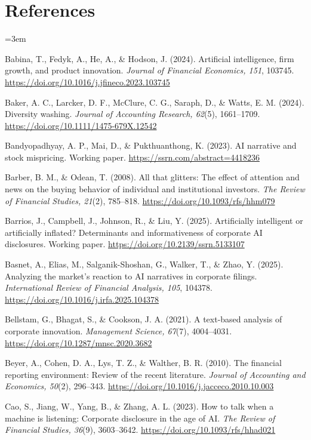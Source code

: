 \clearpage
\section*{References}

\begingroup
\small
\raggedright
\setlength{\parindent}{0pt}
\setlength{\parskip}{0.6em}
\emergencystretch=3em
\sloppy

Babina, T., Fedyk, A., He, A., \& Hodson, J. (2024). Artificial intelligence, firm growth, and product innovation. \textit{Journal of Financial Economics, 151}, 103745. \url{https://doi.org/10.1016/j.jfineco.2023.103745}

Baker, A. C., Larcker, D. F., McClure, C. G., Saraph, D., \& Watts, E. M. (2024). Diversity washing. \textit{Journal of Accounting Research, 62}(5), 1661--1709. \url{https://doi.org/10.1111/1475-679X.12542}

Bandyopadhyay, A. P., Mai, D., \& Pukthuanthong, K. (2023). AI narrative and stock mispricing. Working paper. \url{https://ssrn.com/abstract=4418236}

Barber, B. M., \& Odean, T. (2008). All that glitters: The effect of attention and news on the buying behavior of individual and institutional investors. \textit{The Review of Financial Studies, 21}(2), 785--818. \url{https://doi.org/10.1093/rfs/hhm079}

Barrios, J., Campbell, J., Johnson, R., \& Liu, Y. (2025). Artificially intelligent or artificially inflated? Determinants and informativeness of corporate AI disclosures. Working paper. \url{https://doi.org/10.2139/ssrn.5133107}

Basnet, A., Elias, M., Salganik-Shoshan, G., Walker, T., \& Zhao, Y. (2025). Analyzing the market's reaction to AI narratives in corporate filings. \textit{International Review of Financial Analysis, 105}, 104378. \url{https://doi.org/10.1016/j.irfa.2025.104378}

Bellstam, G., Bhagat, S., \& Cookson, J. A. (2021). A text-based analysis of corporate innovation. \textit{Management Science, 67}(7), 4004--4031. \url{https://doi.org/10.1287/mnsc.2020.3682}

Beyer, A., Cohen, D. A., Lys, T. Z., \& Walther, B. R. (2010). The financial reporting environment: Review of the recent literature. \textit{Journal of Accounting and Economics, 50}(2), 296--343. \url{https://doi.org/10.1016/j.jacceco.2010.10.003}

Cao, S., Jiang, W., Yang, B., \& Zhang, A. L. (2023). How to talk when a machine is listening: Corporate disclosure in the age of AI. \textit{The Review of Financial Studies, 36}(9), 3603--3642. \url{https://doi.org/10.1093/rfs/hhad021}

